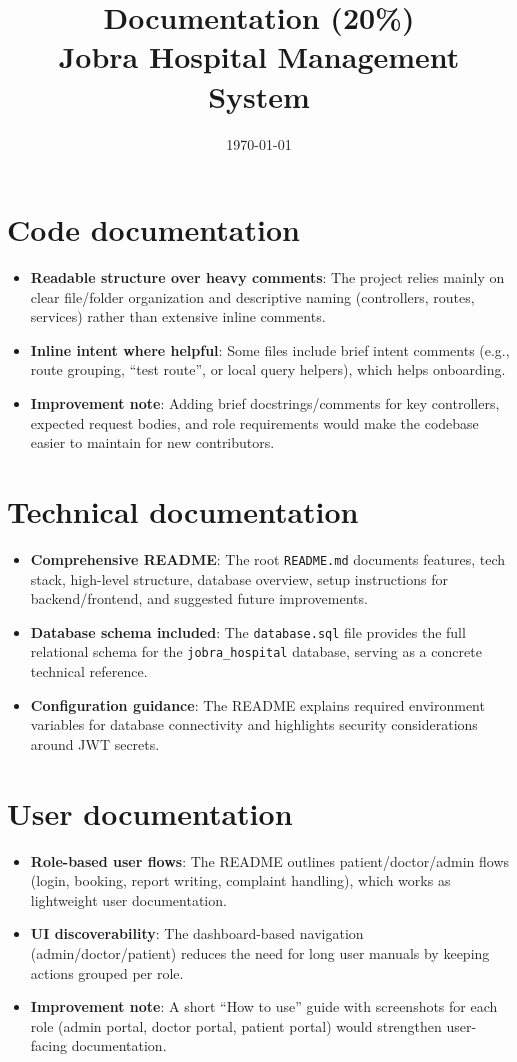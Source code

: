 \documentclass[12pt,a4paper]{article}
\title{Documentation (20\%)\\Jobra Hospital Management System}
\author{}
\date{\today}
\begin{document}
\maketitle

\section{Code documentation}
\begin{itemize}[leftmargin=*, itemsep=0.4em]
  \item \textbf{Readable structure over heavy comments}: The project relies mainly on clear file/folder organization and descriptive naming (controllers, routes, services) rather than extensive inline comments.
  \item \textbf{Inline intent where helpful}: Some files include brief intent comments (e.g., route grouping, ``test route'', or local query helpers), which helps onboarding.
  \item \textbf{Improvement note}: Adding brief docstrings/comments for key controllers, expected request bodies, and role requirements would make the codebase easier to maintain for new contributors.
\end{itemize}

\section{Technical documentation}
\begin{itemize}[leftmargin=*, itemsep=0.4em]
  \item \textbf{Comprehensive README}: The root \texttt{README.md} documents features, tech stack, high-level structure, database overview, setup instructions for backend/frontend, and suggested future improvements.
  \item \textbf{Database schema included}: The \texttt{database.sql} file provides the full relational schema for the \texttt{jobra\_hospital} database, serving as a concrete technical reference.
  \item \textbf{Configuration guidance}: The README explains required environment variables for database connectivity and highlights security considerations around JWT secrets.
\end{itemize}

\section{User documentation}
\begin{itemize}[leftmargin=*, itemsep=0.4em]
  \item \textbf{Role-based user flows}: The README outlines patient/doctor/admin flows (login, booking, report writing, complaint handling), which works as lightweight user documentation.
  \item \textbf{UI discoverability}: The dashboard-based navigation (admin/doctor/patient) reduces the need for long user manuals by keeping actions grouped per role.
  \item \textbf{Improvement note}: A short ``How to use'' guide with screenshots for each role (admin portal, doctor portal, patient portal) would strengthen user-facing documentation.
\end{itemize}
\end{document}
